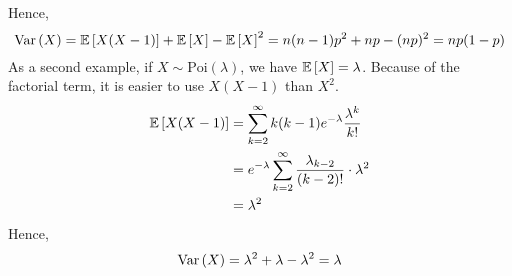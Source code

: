 Hence,
\[
	\operatorname{Var}\left({X}\right) = \mathbb{E}\left[{X(X-1)}\right] + \mathbb{E}\left[{X}\right] - \mathbb{E}\left[{X}\right]^2 = n(n-1)p^2 + np - (np)^2 = np(1-p)
\]
As a second example, if \(X \sim \text{Poi}(\lambda)\), we have \(\mathbb{E}\left[{X}\right] = \lambda\).
Because of the factorial term, it is easier to use \(X(X-1)\) than \(X^2\).
\begin{align*}
	\mathbb{E}\left[{X(X-1)}\right] & = \sum_{k=2}^\infty k(k-1) e^{-\lambda} \frac{\lambda^k}{k!}                  \\
	                & = e^{-\lambda} \sum_{k=2}^\infty \frac{\lambda_{k-2}}{(k-2)!} \cdot \lambda^2 \\
	                & = \lambda^2
\end{align*}
Hence,
\[
	\operatorname{Var}\left({X}\right) = \lambda^2 + \lambda - \lambda^2 = \lambda
\]
